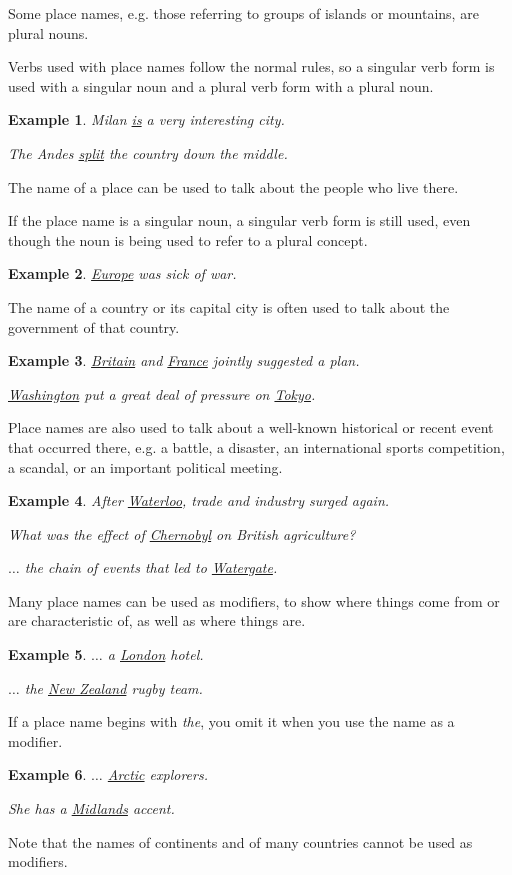\documentclass[oneside]{book}
\numberwithin{equation}{section}
\newtheorem{example}{Example}[section]
\begin{document}
Some place names, e.g. those referring to groups of islands or mountains, are plural nouns.

Verbs used with place names follow the normal rules, so a singular verb form is used with a singular noun and a plural verb form with a plural noun.
\begin{example}
    Milan \underline{is} a very interesting city.
    
    The Andes \underline{split} the country down the middle.
\end{example}
%
\noindent{} The name of a place can be used to talk about the people who live there.

If the place name is a singular noun, a singular verb form is still used, even though the noun is being used to refer to a plural concept.
\begin{example}
    \underline{Europe} was sick of war.
\end{example}
The name of a country or its capital city is often used to talk about the government of that country.
\begin{example}
    \underline{Britain} and \underline{France} jointly suggested a plan.
    
    \underline{Washington} put a great deal of pressure on \underline{Tokyo}.
\end{example}
%
\noindent{} Place names are also used to talk about a well-known historical or recent event that occurred there, e.g. a battle, a disaster, an international sports competition, a scandal, or an important political meeting.
\begin{example}
    After \underline{Waterloo}, trade and industry surged again.
    
    What was the effect of \underline{Chernobyl} on British agriculture?
    
    $\ldots$ the chain of events that led to \underline{Watergate}.
\end{example}
%
\noindent{} Many place names can be used as modifiers, to show where things come from or are characteristic of, as well as where things are.
\begin{example}
    $\ldots$ a \underline{London} hotel.
    
    $\ldots$ the \underline{New Zealand} rugby team.
\end{example}
If a place name begins with \textit{the}, you omit it when you use the name as a modifier.
\begin{example}
    $\ldots$ \underline{Arctic} explorers.
    
    She has a \underline{Midlands} accent.
\end{example}
Note that the names of continents and of many countries cannot be used as modifiers.
\end{document}
